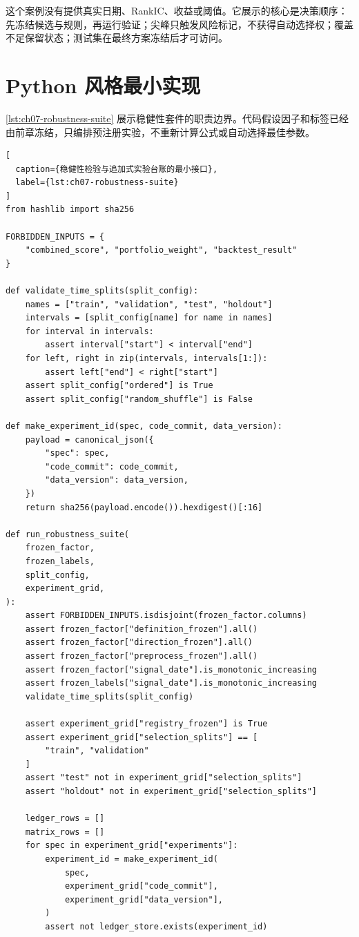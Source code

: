 这个案例没有提供真实日期、RankIC、收益或阈值。它展示的核心是决策顺序：先冻结候选与规则，再运行验证；尖峰只触发风险标记，不获得自动选择权；覆盖不足保留状态；测试集在最终方案冻结后才可访问。

\section{Python 风格最小实现}

\cref{lst:ch07-robustness-suite} 展示稳健性套件的职责边界。代码假设因子和标签已经由前章冻结，只编排预注册实验，不重新计算公式或自动选择最佳参数。

\begin{lstlisting}[
  caption={稳健性检验与追加式实验台账的最小接口},
  label={lst:ch07-robustness-suite}
]
from hashlib import sha256

FORBIDDEN_INPUTS = {
    "combined_score", "portfolio_weight", "backtest_result"
}

def validate_time_splits(split_config):
    names = ["train", "validation", "test", "holdout"]
    intervals = [split_config[name] for name in names]
    for interval in intervals:
        assert interval["start"] < interval["end"]
    for left, right in zip(intervals, intervals[1:]):
        assert left["end"] < right["start"]
    assert split_config["ordered"] is True
    assert split_config["random_shuffle"] is False

def make_experiment_id(spec, code_commit, data_version):
    payload = canonical_json({
        "spec": spec,
        "code_commit": code_commit,
        "data_version": data_version,
    })
    return sha256(payload.encode()).hexdigest()[:16]

def run_robustness_suite(
    frozen_factor,
    frozen_labels,
    split_config,
    experiment_grid,
):
    assert FORBIDDEN_INPUTS.isdisjoint(frozen_factor.columns)
    assert frozen_factor["definition_frozen"].all()
    assert frozen_factor["direction_frozen"].all()
    assert frozen_factor["preprocess_frozen"].all()
    assert frozen_factor["signal_date"].is_monotonic_increasing
    assert frozen_labels["signal_date"].is_monotonic_increasing
    validate_time_splits(split_config)

    assert experiment_grid["registry_frozen"] is True
    assert experiment_grid["selection_splits"] == [
        "train", "validation"
    ]
    assert "test" not in experiment_grid["selection_splits"]
    assert "holdout" not in experiment_grid["selection_splits"]

    ledger_rows = []
    matrix_rows = []
    for spec in experiment_grid["experiments"]:
        experiment_id = make_experiment_id(
            spec,
            experiment_grid["code_commit"],
            experiment_grid["data_version"],
        )
        assert not ledger_store.exists(experiment_id)


\end{lstlisting}
